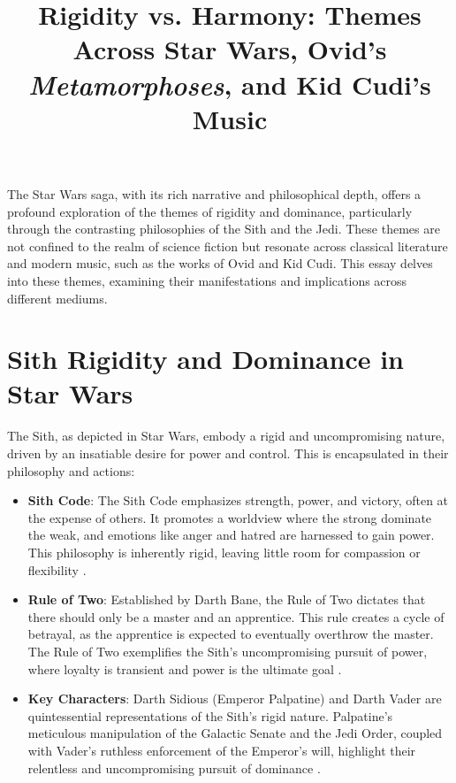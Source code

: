 \documentclass{article}
\title{Rigidity vs. Harmony: Themes Across Star Wars, Ovid's \textit{Metamorphoses}, and Kid Cudi's Music}
\author{}
\date{}
\begin{document}
\maketitle

The Star Wars saga, with its rich narrative and philosophical depth, offers a profound exploration of the themes of rigidity and dominance, particularly through the contrasting philosophies of the Sith and the Jedi. These themes are not confined to the realm of science fiction but resonate across classical literature and modern music, such as the works of Ovid and Kid Cudi. This essay delves into these themes, examining their manifestations and implications across different mediums.

\section*{Sith Rigidity and Dominance in Star Wars}

The Sith, as depicted in Star Wars, embody a rigid and uncompromising nature, driven by an insatiable desire for power and control. This is encapsulated in their philosophy and actions:

\begin{itemize}
    \item \textbf{Sith Code}: The Sith Code emphasizes strength, power, and victory, often at the expense of others. It promotes a worldview where the strong dominate the weak, and emotions like anger and hatred are harnessed to gain power. This philosophy is inherently rigid, leaving little room for compassion or flexibility \cite{serter2021light}.
    \item \textbf{Rule of Two}: Established by Darth Bane, the Rule of Two dictates that there should only be a master and an apprentice. This rule creates a cycle of betrayal, as the apprentice is expected to eventually overthrow the master. The Rule of Two exemplifies the Sith's uncompromising pursuit of power, where loyalty is transient and power is the ultimate goal \cite{forbes1999battling}.
    \item \textbf{Key Characters}: Darth Sidious (Emperor Palpatine) and Darth Vader are quintessential representations of the Sith's rigid nature. Palpatine's meticulous manipulation of the Galactic Senate and the Jedi Order, coupled with Vader's ruthless enforcement of the Emperor's will, highlight their relentless and uncompromising pursuit of dominance \cite{springer2019star}.
\end{itemize}
\end{document}
